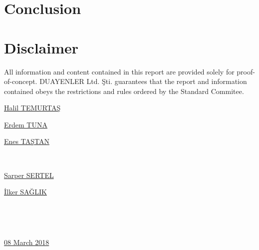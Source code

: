 \documentclass[a4paper,12pt]{article}
\begin{document}
		\newpage
	
	\section{Conclusion}
	
	\newpage
		\section{Disclaimer}
		\vspace{1cm}
		
		\textsf{ All information and content contained in this report are provided solely for proof-of-concept. DUAYENLER Ltd. Şti. guarantees that the report and information contained obeys the restrictions and rules ordered by the Standard Commitee.}
		
		\vspace{1cm}
		
		
		\begin{minipage}[b]{0.33\linewidth}
			\centering
			\underline{Halil TEMURTAŞ}
		\end{minipage}%
		\begin{minipage}[b]{0.33\linewidth}
			\centering
			\underline{Erdem TUNA}
		\end{minipage}%
		\begin{minipage}[b]{0.33\linewidth}
			\centering
			\underline{Enes TAŞTAN}
		\end{minipage} \\[2.5cm]
		
		\begin{minipage}[b]{0.495\linewidth}
			\centering
			\underline{Sarper SERTEL}
		\end{minipage}%
		\begin{minipage}[b]{0.495\linewidth}
			\centering
			\underline{İlker SAĞLIK}
		\end{minipage}\\[2.5cm]
		
		\begin{minipage}[b]{0.745\linewidth}
			\centering
			~~
		\end{minipage}%
		\begin{minipage}[b]{0.25\linewidth}
			\centering
			\underline{08 March 2018}
		\end{minipage}

\newpage

\begin{appendices}
	
		
		

	
\end{appendices}




	
	
	
\end{document}
